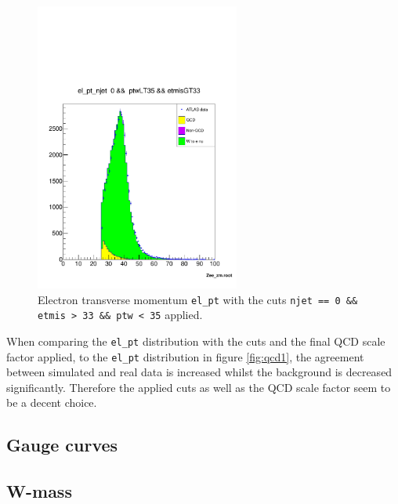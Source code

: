     \begin{figure}[H]
        \centering
        \includegraphics[width=0.6\textwidth]{../W_mass/el_pt_final_cut_selection.pdf}
        \caption{Electron transverse momentum \texttt{el\_pt} with the cuts \texttt{njet == 0 \&\& etmis > 33 \&\& ptw < 35} applied.}
        \label{fig:el_pt_cuts}
    \end{figure}
    When comparing the \texttt{el\_pt} distribution with the cuts and the final QCD scale factor applied, to the \texttt{el\_pt} distribution in figure \ref{fig:qcd1},
    the agreement between simulated and real data is increased whilst the background is decreased significantly. Therefore the applied cuts as well as the QCD scale factor
    seem to be a decent choice.

\subsection{Gauge curves}

\subsection{W-mass }
